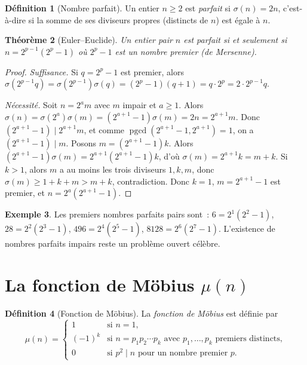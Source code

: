\documentclass[12pt,a4paper,openany]{book}
\theoremstyle{definition}
\newtheorem{definition}{Définition}[chapter]
\newtheorem{exemple}[definition]{Exemple}
\theoremstyle{plain}
\newtheorem{theoreme}[definition]{Théorème}
\theoremstyle{remark}
\DeclareMathOperator{\pgcd}{pgcd}
\begin{document}
\begin{definition}[Nombre parfait]
\label{def:nombre-parfait}
Un entier $n \geq 2$ est \emph{parfait} si $\sigma(n) = 2n$, c'est-à-dire si la somme
de ses diviseurs propres (distincts de $n$) est égale à $n$.
\end{definition}

\begin{theoreme}[Euler--Euclide]
\label{thm:euler-euclide-parfaits}
Un entier pair $n$ est parfait si et seulement si $n = 2^{p-1}(2^p - 1)$ où $2^p - 1$
est un nombre premier (de Mersenne).
\end{theoreme}

\begin{proof}
\emph{Suffisance.} Si $q = 2^p - 1$ est premier, alors
$\sigma(2^{p-1}q) = \sigma(2^{p-1})\sigma(q) = (2^p - 1)(q + 1) = q \cdot 2^p
= 2 \cdot 2^{p-1}q$.

\emph{Nécessité.} Soit $n = 2^{a}m$ avec $m$ impair et $a \geq 1$. Alors
$\sigma(n) = \sigma(2^a)\sigma(m) = (2^{a+1}-1)\sigma(m) = 2n = 2^{a+1}m$. Donc
$(2^{a+1}-1) \mid 2^{a+1}m$, et comme $\pgcd(2^{a+1}-1, 2^{a+1}) = 1$, on a
$(2^{a+1}-1) \mid m$. Posons $m = (2^{a+1}-1)k$. Alors
$(2^{a+1}-1)\sigma(m) = 2^{a+1}(2^{a+1}-1)k$, d'où $\sigma(m) = 2^{a+1}k = m + k$.
Si $k > 1$, alors $m$ a au moins les trois diviseurs $1, k, m$, donc
$\sigma(m) \geq 1 + k + m > m + k$, contradiction. Donc $k = 1$, $m = 2^{a+1} - 1$
est premier, et $n = 2^a(2^{a+1}-1)$.
\end{proof}

\begin{exemple}
\label{ex:nombres-parfaits}
Les premiers nombres parfaits pairs sont~: $6 = 2^1(2^2-1)$, $28 = 2^2(2^3-1)$,
$496 = 2^4(2^5-1)$, $8128 = 2^6(2^7-1)$.
L'existence de nombres parfaits impairs reste un problème ouvert célèbre.
\end{exemple}

\section{La fonction de Möbius $\mu(n)$}
\label{sec:mobius}

\begin{definition}[Fonction de Möbius]
\label{def:mobius}
La \emph{fonction de Möbius} est définie par
\[
  \mu(n) = \begin{cases}
    1 & \text{si } n = 1, \\
    (-1)^k & \text{si } n = p_1 p_2 \cdots p_k \text{ avec } p_1, \ldots, p_k
      \text{ premiers distincts,} \\
    0 & \text{si } p^2 \mid n \text{ pour un nombre premier } p.
  \end{cases}
\]
\end{definition}
\end{document}
